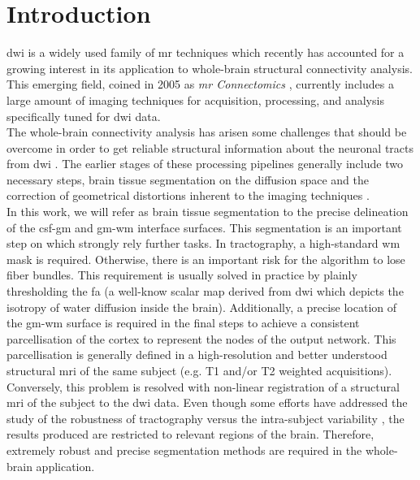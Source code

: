 \section{Introduction}
\label{sec:introduction}
%
\ac{dwi} is a widely used family of \ac{mr} techniques
\citep{sundgren_diffusion_2004} which recently has accounted for a growing
interest in its application to whole-brain structural connectivity analysis.
This emerging field, coined in 2005 as \emph{\ac{mr} Connectomics}
\citep{hagmann_diffusion_2005,sporns_human_2005}, currently includes a
large amount of imaging techniques for acquisition, processing, and analysis
specifically tuned for \ac{dwi} data.\\

The whole-brain connectivity analysis has arisen some challenges
that should be overcome in order to get reliable structural information
about the neuronal tracts from \ac{dwi} \cite{johansen-berg_using_2009,
jones_white_2012}. The earlier stages of these
processing pipelines generally include two necessary steps, brain tissue
segmentation on the diffusion space and the correction of geometrical
distortions inherent to the imaging techniques \citep{hagmann_mr_2012}.\\

In this work, we will refer as brain tissue segmentation to the precise
delineation of the \ac{csf}-\ac{gm} and \ac{gm}-\ac{wm} interface surfaces.
This segmentation is an important step on which strongly rely further
tasks. In tractography, a high-standard \ac{wm} mask is required. Otherwise,
there is an important risk for the algorithm to lose fiber bundles. This
requirement is usually solved in practice by plainly thresholding the 
\ac{fa} (a well-know scalar map derived from \ac{dwi} which depicts 
the isotropy of water diffusion inside the brain). 
Additionally, a precise location of the
\ac{gm}-\ac{wm} surface is required in the final steps to
achieve a consistent parcellisation of the cortex to represent the nodes 
of the output network. This parcellisation is generally defined in a 
high-resolution and better understood structural \ac{mri} of the same 
subject (e.g. T1 and/or T2 weighted acquisitions). Conversely, this 
problem is resolved with non-linear registration of a structural \ac{mri}
of the subject to the \ac{dwi} data. Even though some efforts have addressed
the study of the robustness of tractography versus the intra-subject variability
\cite{wakana_reproducibility_2007,heiervang_between_2006}, the results produced
are restricted to relevant regions of the brain. Therefore, extremely robust
and precise segmentation methods are required in the whole-brain application. \\

